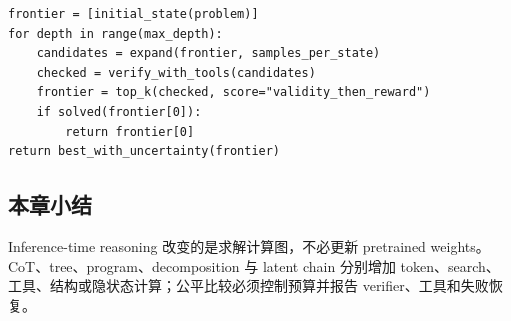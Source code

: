 \begin{lstlisting}[caption={预算受限的 reasoning search 伪代码}]
frontier = [initial_state(problem)]
for depth in range(max_depth):
    candidates = expand(frontier, samples_per_state)
    checked = verify_with_tools(candidates)
    frontier = top_k(checked, score="validity_then_reward")
    if solved(frontier[0]):
        return frontier[0]
return best_with_uncertainty(frontier)
\end{lstlisting}

\subsection{本章小结}

Inference-time reasoning 改变的是求解计算图，不必更新 pretrained weights。CoT、tree、program、decomposition 与 latent chain 分别增加 token、search、工具、结构或隐状态计算；公平比较必须控制预算并报告 verifier、工具和失败恢复。

